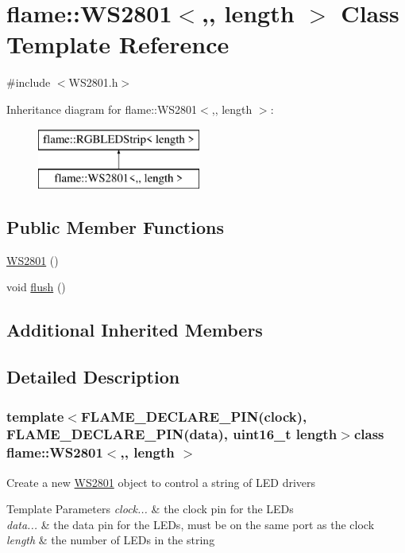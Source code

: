 \hypertarget{classflame_1_1_w_s2801}{\section{flame\-:\-:W\-S2801$<$,, length $>$ Class Template Reference}
\label{classflame_1_1_w_s2801}
}


{\ttfamily \#include $<$W\-S2801.\-h$>$}

Inheritance diagram for flame\-:\-:W\-S2801$<$,, length $>$\-:\begin{figure}[H]
\begin{center}
\leavevmode
\includegraphics[height=2.000000cm]{classflame_1_1_w_s2801}
\end{center}
\end{figure}
\subsection*{Public Member Functions}
\begin{DoxyCompactItemize}
\item 
\hyperlink{classflame_1_1_w_s2801_a95d6bd232fa1cf4def396deec89a6c09}{W\-S2801} ()
\item 
void \hyperlink{classflame_1_1_w_s2801_af36d043e8554e1834980b485766396f6}{flush} ()
\end{DoxyCompactItemize}
\subsection*{Additional Inherited Members}


\subsection{Detailed Description}
\subsubsection*{template$<$F\-L\-A\-M\-E\-\_\-\-D\-E\-C\-L\-A\-R\-E\-\_\-\-P\-I\-N(clock), F\-L\-A\-M\-E\-\_\-\-D\-E\-C\-L\-A\-R\-E\-\_\-\-P\-I\-N(data), uint16\-\_\-t length$>$class flame\-::\-W\-S2801$<$,, length $>$}

Create a new \hyperlink{classflame_1_1_w_s2801}{W\-S2801} object to control a string of L\-E\-D drivers 
\begin{DoxyTemplParams}{Template Parameters}
{\em clock...} & the clock pin for the L\-E\-Ds \\
\hline
{\em data...} & the data pin for the L\-E\-Ds, must be on the same port as the clock \\
\hline
{\em length} & the number of L\-E\-Ds in the string \\
\hline
\end{DoxyTemplParams}


